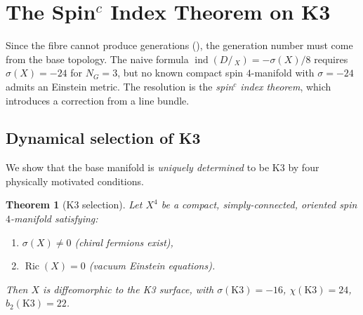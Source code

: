 \documentclass[12pt,a4paper]{article}
\newtheorem{theorem}{Theorem}[section]
\theoremstyle{definition}
\newcommand{\ind}{\operatorname{ind}}
\begin{document}
\section{The \texorpdfstring{Spin$^c$}{Spinc} Index Theorem on K3}
\label{sec:spinc}

Since the fibre cannot produce generations (), the generation number must come from the base topology.
The naive formula $\ind(D\!\!\!\!/\,_X) = -\sigma(X)/8$ requires $\sigma(X) = -24$ for $N_G = 3$, but no known compact spin $4$-manifold with $\sigma = -24$ admits an Einstein metric.
The resolution is the \emph{spin$^c$ index theorem}, which introduces a correction from a line bundle.

\subsection{Dynamical selection of K3}
\label{sec:K3_selection}

We show that the base manifold is \emph{uniquely determined} to be K3 by four physically motivated conditions.

\begin{theorem}[K3 selection]
\label{thm:K3}
Let $X^4$ be a compact, simply-connected, oriented spin $4$-manifold satisfying:
\begin{enumerate}[nosep,label=\textup{(\alph*)}]
\item $\sigma(X) \neq 0$ \textup{(chiral fermions exist)},
\item $\operatorname{Ric}(X) = 0$ \textup{(vacuum Einstein equations)}.
\end{enumerate}
Then $X$ is diffeomorphic to the K3 surface, with $\sigma(\mathrm{K3}) = -16$, $\chi(\mathrm{K3}) = 24$, $b_2(\mathrm{K3}) = 22$.
\end{theorem}
\end{document}
